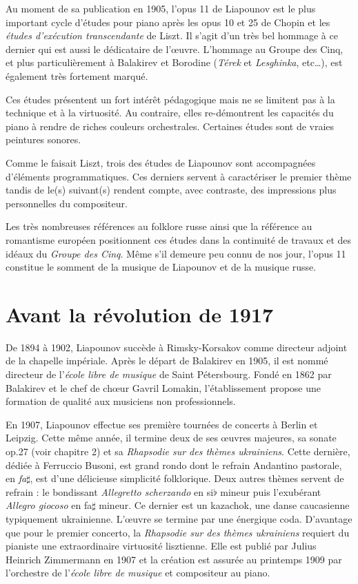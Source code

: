 Au moment de sa publication en 1905, l'opus 11 de Liapounov est le plus important cycle d'études pour piano après les opus 10 et 25 de Chopin et les \emph{études d'exécution transcendante} de Liszt. Il s'agit d'un très bel hommage à ce dernier qui est aussi le dédicataire de l'œuvre. L'hommage au Groupe des Cinq, et plus particulièrement à Balakirev et Borodine (\emph{Térek} et \emph{Lesghinka}, etc\dots), est également très fortement marqué.

Ces études présentent un fort intérêt pédagogique mais ne se limitent pas à la technique et à la virtuosité. Au contraire, elles re-démontrent les capacités du piano à rendre de riches couleurs orchestrales. Certaines études sont de vraies peintures sonores.

Comme le faisait Liszt, trois des études de Liapounov sont accompagnées d'éléments programmatiques. Ces derniers servent à caractériser le premier thème tandis de le(s) suivant(s) rendent compte, avec contraste, des impressions plus personnelles du compositeur.

Les très nombreuses références au folklore russe ainsi que la référence au romantisme européen positionnent ces études dans la continuité de travaux et des idéaux du \emph{Groupe des Cinq}. Même s'il demeure peu connu de nos jour, l'opus 11 constitue le somment de la musique de Liapounov et de la musique russe.

\newpage

\section{Avant la révolution de 1917}

De 1894 à 1902, Liapounov succède à Rimsky-Korsakov comme directeur adjoint de la chapelle impériale. Après le départ de Balakirev en 1905, il est nommé directeur de l'\emph{école libre de musique} de Saint Pétersbourg. Fondé en 1862 par Balakirev et le chef de chœur Gavril Lomakin, l'établissement propose une formation de qualité aux musiciens non professionnels.

En 1907, Liapounov effectue ses première tournées de concerts à Berlin et Leipzig. Cette même année, il termine deux de ses œuvres majeures, sa sonate op.27 (voir chapitre 2) et sa \emph{Rhapsodie sur des thèmes ukrainiens}. Cette dernière, dédiée à Ferruccio Busoni, est grand rondo dont le refrain {Andantino pastorale}, en \emph{fa}$\sharp$, est d'une délicieuse simplicité folklorique. Deux autres thèmes servent de refrain : le bondissant \emph{Allegretto scherzando} en si$\flat$ mineur puis l’exubérant \emph{Allegro giocoso} en fa$\sharp$ mineur. Ce dernier est un kazachok, une danse caucasienne typiquement ukrainienne. L'œuvre se termine par une énergique coda. D'avantage que pour le premier concerto, la \emph{Rhapsodie sur des thèmes ukrainiens} requiert du pianiste une extraordinaire virtuosité lisztienne. Elle est publié par Julius Heinrich Zimmermann en 1907 et la création est assurée au printemps 1909 par l'orchestre de l'\emph{école libre de musique} et compositeur au piano.

